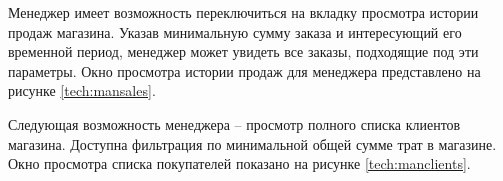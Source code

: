 Менеджер имеет возможность переключиться на вкладку просмотра истории продаж магазина. Указав минимальную сумму заказа и интересующий его временной период, менеджер может увидеть все заказы, подходящие под эти параметры. Окно просмотра истории продаж для менеджера представлено на рисунке \ref{tech:mansales}.

\begin{figure}[H]
\end{figure}

Следующая возможность менеджера -- просмотр полного списка клиентов магазина. Доступна фильтрация по минимальной общей сумме трат в магазине. Окно просмотра списка покупателей показано на рисунке \ref{tech:manclients}.

\begin{figure}[H]
\end{figure}

